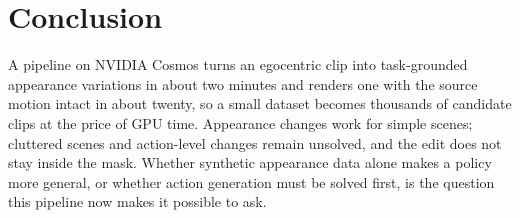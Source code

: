 \section{Conclusion}
A pipeline on NVIDIA Cosmos turns an egocentric clip into task-grounded appearance variations in about two minutes and renders one with the source motion intact in about twenty, so a small dataset becomes thousands of candidate clips at the price of GPU time. Appearance changes work for simple scenes; cluttered scenes and action-level changes remain unsolved, and the edit does not stay inside the mask. Whether synthetic appearance data alone makes a policy more general, or whether action generation must be solved first, is the question this pipeline now makes it possible to ask.
